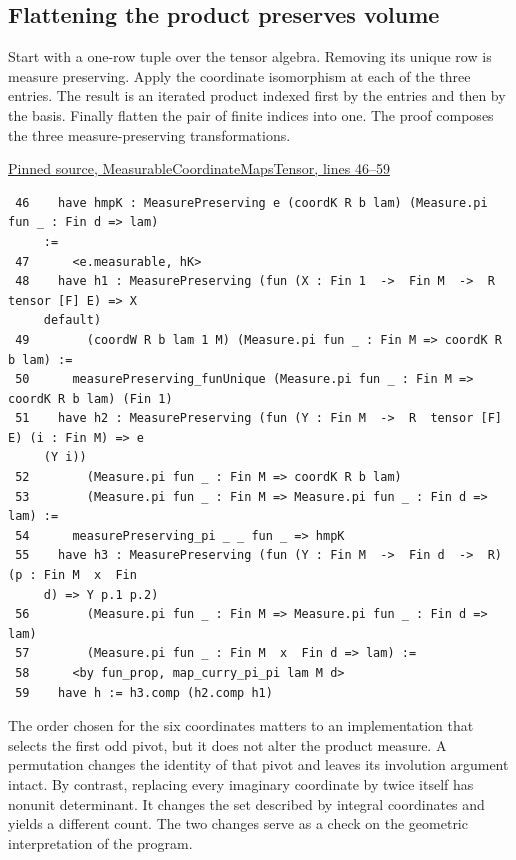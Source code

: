 \documentclass[12pt,letterpaper]{article}
\begin{document}
\clearpage\subsection*{Flattening the product preserves volume}

Start with a one-row tuple over the tensor algebra. Removing its unique row is measure preserving. Apply the coordinate isomorphism at each of the three entries. The result is an iterated product indexed first by the entries and then by the basis. Finally flatten the pair of finite indices into one. The proof composes the three measure-preserving transformations.

\par\smallskip\href{https://github.com/nousentllc/riemann-hypothesis/blob/40e56bab026552e089d7afcfeff08d2defb9c005/src/CompanionTheory/SpectralGeometry/LocalGlobalProofs/AdelicAnalysis/MeasurableCoordinateMapsTensor.lean#L46-L59}{\sffamily\small Pinned source, MeasurableCoordinateMapsTensor, lines 46--59}\par

{\footnotesize\begin{verbatim}
 46    have hmpK : MeasurePreserving e (coordK R b lam) (Measure.pi fun _ : Fin d => lam)
     :=
 47      <e.measurable, hK>
 48    have h1 : MeasurePreserving (fun (X : Fin 1  ->  Fin M  ->  R  tensor [F] E) => X
     default)
 49        (coordW R b lam 1 M) (Measure.pi fun _ : Fin M => coordK R b lam) :=
 50      measurePreserving_funUnique (Measure.pi fun _ : Fin M => coordK R b lam) (Fin 1)
 51    have h2 : MeasurePreserving (fun (Y : Fin M  ->  R  tensor [F] E) (i : Fin M) => e
     (Y i))
 52        (Measure.pi fun _ : Fin M => coordK R b lam)
 53        (Measure.pi fun _ : Fin M => Measure.pi fun _ : Fin d => lam) :=
 54      measurePreserving_pi _ _ fun _ => hmpK
 55    have h3 : MeasurePreserving (fun (Y : Fin M  ->  Fin d  ->  R) (p : Fin M  x  Fin
     d) => Y p.1 p.2)
 56        (Measure.pi fun _ : Fin M => Measure.pi fun _ : Fin d => lam)
 57        (Measure.pi fun _ : Fin M  x  Fin d => lam) :=
 58      <by fun_prop, map_curry_pi_pi lam M d>
 59    have h := h3.comp (h2.comp h1)
\end{verbatim}
}

The order chosen for the six coordinates matters to an implementation that selects the first odd pivot, but it does not alter the product measure. A permutation changes the identity of that pivot and leaves its involution argument intact. By contrast, replacing every imaginary coordinate by twice itself has nonunit determinant. It changes the set described by integral coordinates and yields a different count. The two changes serve as a check on the geometric interpretation of the program.
\end{document}
